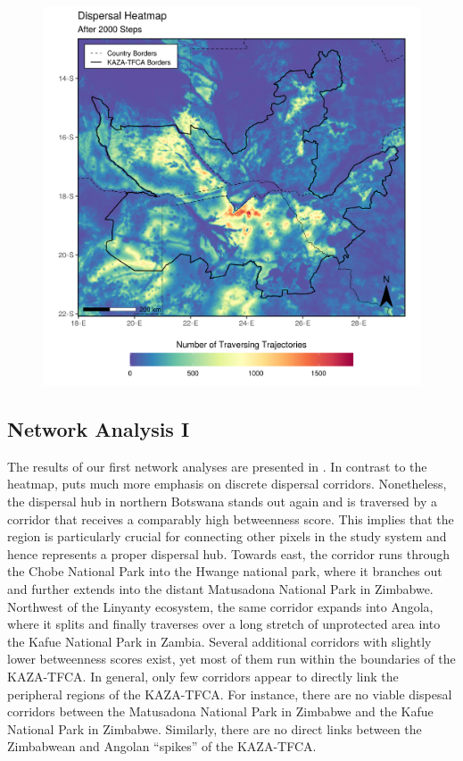 \documentclass[abstract=on,10pt,a4paper,bibliography=totocnumbered]{article}
\begin{document}
\begin{figure}
  \includegraphics[width=\textwidth]{99_Heatmap.png}
  \caption{}
  \label{Heatmap}
\end{figure}

\subsection{Network Analysis I}
The results of our first network analyses are presented in .
In contrast to the heatmap,  puts much more emphasis on
discrete dispersal corridors. Nonetheless, the dispersal hub in northern
Botswana stands out again and is traversed by a corridor that receives a
comparably high betweenness score. This implies that the region is particularly
crucial for connecting other pixels in the study system and hence represents a
proper dispersal hub. Towards east, the corridor runs through the Chobe National
Park into the Hwange national park, where it branches out and further extends
into the distant Matusadona National Park in Zimbabwe. Northwest of the Linyanty
ecosystem, the same corridor expands into Angola, where it splits and finally
traverses over a long stretch of unprotected area into the Kafue National Park
in Zambia. Several additional corridors with slightly lower betweenness scores
exist, yet most of them run within the boundaries of the KAZA-TFCA. In general,
only few corridors appear to directly link the peripheral regions of the
KAZA-TFCA. For instance, there are no viable dispesal corridors between the
Matusadona National Park in Zimbabwe and the Kafue National Park in Zimbabwe.
Similarly, there are no direct links between the Zimbabwean and Angolan
``spikes'' of the KAZA-TFCA.
\end{document}

